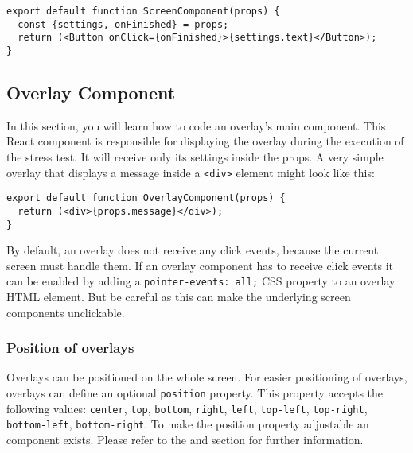 \begin{verbatim}
export default function ScreenComponent(props) {
  const {settings, onFinished} = props;
  return (<Button onClick={onFinished}>{settings.text}</Button>);
}
\end{verbatim}

\subsection{Overlay Component}
\label{sec:development-overlays}
In this section, you will learn how to code an overlay's main component. 
This React component is responsible for displaying the overlay during the execution of the stress test. 
It will receive only its settings inside the props. 
A very simple overlay that displays a message inside a \texttt{<div>} element might look like this:
\begin{verbatim}
export default function OverlayComponent(props) {
  return (<div>{props.message}</div>);
}
\end{verbatim}

By default, an overlay does not receive any click events, because the current screen must handle them. 
If an overlay component has to receive click events it can be enabled by adding a \texttt{pointer-events: all;} CSS property to an overlay HTML element. 
But be careful as this can make the underlying screen components unclickable.

\subsubsection*{Position of overlays}
Overlays can be positioned on the whole screen. 
For easier positioning of overlays, overlays can define an optional \texttt{position} property. 
This property accepts the following values: 
\texttt{center}, \texttt{top}, \texttt{bottom}, \texttt{right}, \texttt{left}, \texttt{top-left}, \texttt{top-right}, \texttt{bottom-left}, \texttt{bottom-right}.
To make the position property adjustable an \texttt{} component exists. 
Please refer to the  and  section for further information.

